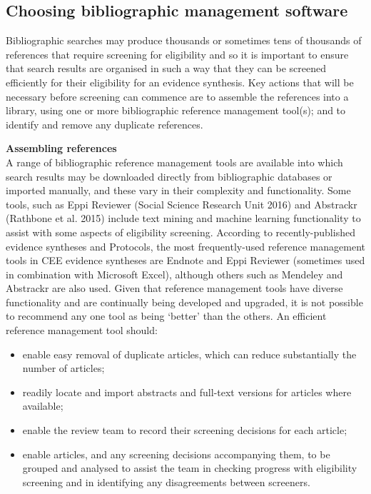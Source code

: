 \documentclass[
  letterpaper,
  DIV=11,
  numbers=noendperiod]{scrreprt}
\begin{document}
\subsection{Choosing bibliographic management
software}\label{choosing-bibliographic-management-software}

Bibliographic searches may produce thousands or sometimes tens of
thousands of references that require screening for eligibility and so it
is important to ensure that search results are organised in such a way
that they can be screened efficiently for their eligibility for an
evidence synthesis. Key actions that will be necessary before screening
can commence are to assemble the references into a library, using one or
more bibliographic reference management tool(s); and to identify and
remove any duplicate references.

\textbf{Assembling references}\\
A range of bibliographic reference management tools are available into
which search results may be downloaded directly from bibliographic
databases or imported manually, and these vary in their complexity and
functionality. Some tools, such as Eppi Reviewer (Social Science
Research Unit 2016) and Abstrackr (Rathbone et al. 2015) include text
mining and machine learning functionality to assist with some aspects of
eligibility screening. According to recently-published evidence
syntheses and Protocols, the most frequently-used reference management
tools in CEE evidence syntheses are Endnote and Eppi Reviewer (sometimes
used in combination with Microsoft Excel), although others such as
Mendeley and Abstrackr are also used. Given that reference management
tools have diverse functionality and are continually being developed and
upgraded, it is not possible to recommend any one tool as being `better'
than the others. An efficient reference management tool should:

\begin{itemize}
\item
  enable easy removal of duplicate articles, which can reduce
  substantially the number of articles;
\item
  readily locate and import abstracts and full-text versions for
  articles where available;
\item
  enable the review team to record their screening decisions for each
  article;
\item
  enable articles, and any screening decisions accompanying them, to be
  grouped and analysed to assist the team in checking progress with
  eligibility screening and in identifying any disagreements between
  screeners.
\end{itemize}
\end{document}
